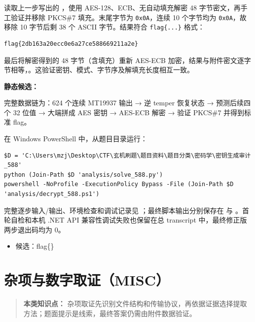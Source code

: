 \texttt{} 读取上一步写出的 \texttt{}，使用 AES-128、ECB、无自动填充解密 48 字节密文，再手工验证并移除 PKCS\#7 填充。末尾字节为 \texttt{0x0A}，连续 10 个字节均为 \texttt{0x0A}，故移除 10 字节后剩 38 个 ASCII 字节。结果符合 \texttt{flag\{...\}} 格式：

\begin{verbatim}
flag{2db163a20ecc0e6a27ce588669211a2e}
\end{verbatim}

最后将解密得到的 48 字节（含填充）重新 AES-ECB 加密，结果与附件密文逐字节相等，\texttt{}。这验证密钥、模式、字节序及解填充长度相互一致。

\textbf{静态候选：\texttt{}}

完整数据链为：624 个连续 MT19937 输出 → 逆 temper 恢复状态 → 预测后续四个 32 位值 → 大端拼成 AES 密钥 → AES-ECB 解密 → 验证 PKCS\#7 并得到标准 flag。

在 Windows PowerShell 中，从题目目录运行：

\begin{verbatim}
$D = 'C:\Users\mzj\Desktop\CTF\玄机刷题\题目资料\题目分类\密码学\密钥生成审计_588'
python (Join-Path $D 'analysis/solve_588.py')
powershell -NoProfile -ExecutionPolicy Bypass -File (Join-Path $D 'analysis/decrypt_588.ps1')
\end{verbatim}

完整逐步输入/输出、环境检查和调试记录见 \texttt{}；最终脚本输出分别保存在 \texttt{} 与 \texttt{}。首轮自检和本机 .NET API 兼容性调试失败也保留在总 transcript 中，最终修正版两步退出码均为 0。

\begin{itemize}
\tightlist
\item
  候选：flag\{\}
\end{itemize}

\chapter{杂项与数字取证（MISC）}\label{ux6742ux9879ux4e0eux6570ux5b57ux53d6ux8bc1misc}

\begin{quote}
\textbf{本类知识点：} 杂项取证先识别文件结构和传输协议，再依据证据选择提取方法；题面提示是线索，最终答案仍需由附件数据验证。
\end{quote}

